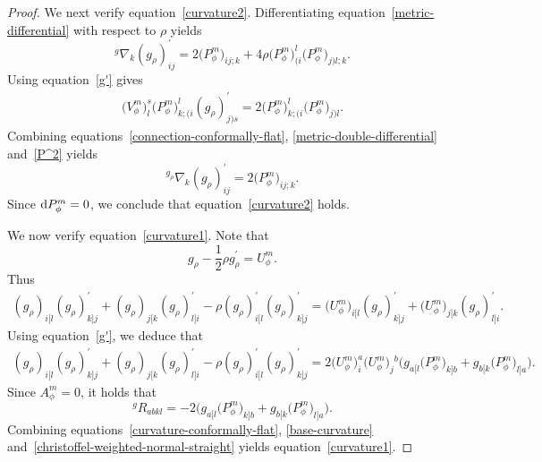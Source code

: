 \documentclass[pdftex]{sigma}
\numberwithin{equation}{section}
\begin{document}
\begin{proof}
We next verify equation~\eqref{curvature2}.
Differentiating equation~\eqref{metric-differential} with respect to $\rho$ yields
\begin{equation}
\label{metric-double-differential}
^{g}\nabla_{k} (g_\rho)_{i j}^{\prime}=2 \big(P_\phi^m\big)_{i j; k}+4 \rho \big(P_\phi^m\big)_{(i}^{l} \big(P_\phi^m\big)_{j) l; k}.
\end{equation}
Using equation~\eqref{g'} gives
\begin{align}
\label{P^2}
\big(V_\phi^m\big)_{l}^{s} \big(P_\phi^m\big)_{k;(i}^{l} (g_\rho)_{j) s}^{\prime}=2 \big(P_\phi^m\big)_{k;(i}^{l} \big(P_\phi^m\big)_{j) l}.
\end{align}
Combining equations~\eqref{connection-conformally-flat}, \eqref{metric-double-differential} and~\eqref{P^2} yields{\samepage
\[
{ }^{g_\rho} \nabla_{k} (g_\rho)_{i j}^{\prime}=2 \big(P_\phi^m\big)_{i j; k}.
\]
Since ${\rm d}P_\phi^m=0$, we conclude that equation~\eqref{curvature2} holds.}

We now verify equation~\eqref{curvature1}. Note that
\[
g_\rho-\frac{1}{2} \rho g_\rho^{\prime}=U_\phi^m.
\]
Thus
\begin{gather*}
(g_\rho)_{i[l} (g_\rho)_{k] j}^{\prime}+(g_\rho)_{j[k} (g_\rho)_{l] i}^{\prime}-\rho (g_\rho)_{i[l}^{\prime} (g_\rho)_{k] j}^{\prime}=\big(U_\phi^m\big)_{i[l} (g_\rho)_{k] j}^{\prime}+\big(U_\phi^m\big)_{j[k} (g_\rho)_{l] i}^{\prime}.
\end{gather*}
Using equation~\eqref{g'}, we deduce that
\begin{gather*}
(g_\rho)_{i[l} (g_\rho)_{k] j}^{\prime}+(g_\rho)_{j[k} (g_\rho)_{l] i}^{\prime}-\rho (g_\rho)_{i[l}^{\prime} (g_\rho)_{k] j}^{\prime}
=2 \big(U_\phi^m\big)_{i}^{a} \big(U_\phi^m\big)_{j}{ }^{b}\bigl(g_{a[l} \big(P_\phi^m\big)_{k] b}+g_{b[k} \big(P_\phi^m\big)_{l] a}\bigr).
\end{gather*}
Since $A_\phi^m=0$, it holds that
\begin{equation}
\label{base-curvature}
{ }^{g} R_{a b k l}=-2\big(g_{a[l} \big(P_\phi^m\big)_{k] b}+g_{b[k} \big(P_\phi^m\big)_{l] a}\big).
\end{equation}
Combining equations~\eqref{curvature-conformally-flat}, \eqref{base-curvature} and~\eqref{christoffel-weighted-normal-straight} yields equation~\eqref{curvature1}.
\end{proof}
\end{document}
